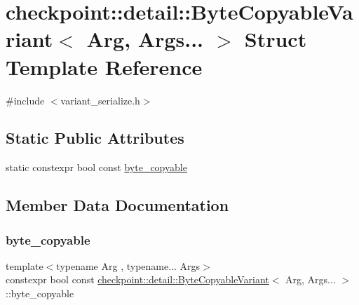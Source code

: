 \hypertarget{structcheckpoint_1_1detail_1_1_byte_copyable_variant_3_01_arg_00_01_args_8_8_8_01_4}{}\section{checkpoint\+:\+:detail\+:\+:Byte\+Copyable\+Variant$<$ Arg, Args... $>$ Struct Template Reference}
\label{structcheckpoint_1_1detail_1_1_byte_copyable_variant_3_01_arg_00_01_args_8_8_8_01_4}


{\ttfamily \#include $<$variant\+\_\+serialize.\+h$>$}

\subsection*{Static Public Attributes}
\begin{DoxyCompactItemize}
\item 
static constexpr bool const \hyperlink{structcheckpoint_1_1detail_1_1_byte_copyable_variant_3_01_arg_00_01_args_8_8_8_01_4_aad927b3301c6fe1b4b61b2c86232c449}{byte\+\_\+copyable}
\end{DoxyCompactItemize}


\subsection{Member Data Documentation}
\mbox{\label{structcheckpoint_1_1detail_1_1_byte_copyable_variant_3_01_arg_00_01_args_8_8_8_01_4_aad927b3301c6fe1b4b61b2c86232c449}} 
\subsubsection{\texorpdfstring{byte\+\_\+copyable}{byte\_copyable}}
{\footnotesize\ttfamily template$<$typename Arg , typename... Args$>$ \\
constexpr bool const \hyperlink{structcheckpoint_1_1detail_1_1_byte_copyable_variant}{checkpoint\+::detail\+::\+Byte\+Copyable\+Variant}$<$ Arg, Args... $>$\+::byte\+\_\+copyable\hspace{0.3cm}{\ttfamily [static]}}

